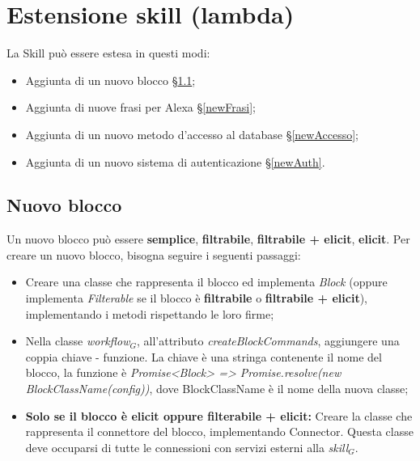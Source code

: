 \section{Estensione skill (lambda)}
La Skill può essere estesa in questi modi:
\begin{itemize}
    \item Aggiunta di un nuovo blocco \S\ref{newBlock};
    \item Aggiunta di nuove frasi per Alexa \S\ref{newFrasi};
    \item Aggiunta di un nuovo metodo d'accesso al database \S\ref{newAccesso};
    \item Aggiunta di un nuovo sistema di autenticazione \S\ref{newAuth}.
\end{itemize}
\subsection{Nuovo blocco}\label{newBlock}
Un nuovo blocco può essere \textbf{semplice}, \textbf{filtrabile}, \textbf{filtrabile + elicit}, \textbf{elicit}.
Per creare un nuovo blocco, bisogna seguire i seguenti passaggi:
\begin{itemize}
	\item Creare una classe che rappresenta il blocco ed implementa \textit{Block} (oppure implementa \textit{Filterable} se il blocco è \textbf{filtrabile} o \textbf{filtrabile + elicit}), implementando i metodi rispettando le loro firme;
	\item Nella classe \textit{workflow$_{G}$}, all'attributo \textit{createBlockCommands}, aggiungere una coppia chiave - funzione. La chiave è una stringa contenente il nome del blocco, la funzione è \textit{Promise<Block> => Promise.resolve(new BlockClassName(config))}, dove BlockClassName è il nome della nuova classe;
	\item \textbf{Solo se il blocco è elicit oppure filterabile + elicit:} Creare la classe che rappresenta il connettore del blocco, implementando Connector. Questa classe deve occuparsi di tutte le connessioni con servizi esterni alla \textit{skill$_{G}$}.
\end{itemize}
